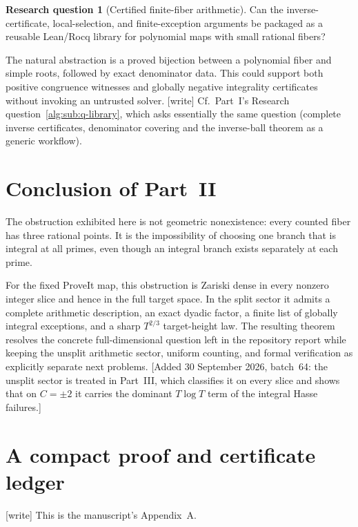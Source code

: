 \documentclass[11pt]{article}
\numberwithin{equation}{section}
\theoremstyle{plain}
\theoremstyle{plain}
\theoremstyle{plain}
\theoremstyle{definition}
\theoremstyle{definition}
\newtheorem{question}[question]{Research question}
\theoremstyle{definition}
\theoremstyle{remark}
\newcommand{\wtag}{\textup{[write]}}%
\begin{document}
\begin{question}[Certified finite-fiber arithmetic]\label{alg:dh:q:library}
Can the inverse-certificate, local-selection, and finite-exception
arguments be packaged as a reusable Lean/Rocq library for polynomial
maps with small rational fibers?
\end{question}
The natural abstraction is a proved bijection between a polynomial
fiber and simple roots, followed by exact denominator data. This could
support both positive congruence witnesses and globally negative
integrality certificates without invoking an untrusted solver.
\wtag{} Cf.\ Part~I's Research question~\ref{alg:sub:q-library}, which
asks essentially the same question (complete inverse certificates,
denominator covering and the inverse-ball theorem as a generic
workflow).

\section{Conclusion of Part~II}\label{alg:dh:sec:conclusion}
The obstruction exhibited here is not geometric nonexistence: every
counted fiber has three rational points. It is the impossibility of
choosing one branch that is integral at all primes, even though an
integral branch exists separately at each prime.

For the fixed ProveIt map, this obstruction is Zariski dense in every
nonzero integer slice and hence in the full target space. In the split
sector it admits a complete arithmetic description, an exact dyadic
factor, a finite list of globally integral exceptions, and a sharp
$T^{2/3}$ target-height law. The resulting theorem resolves the concrete
full-dimensional question left in the repository report while keeping
the unsplit arithmetic sector, uniform counting, and formal verification
as explicitly separate next problems.
[Added 30 September 2026, batch~64: the unsplit sector is treated in
Part~III, which classifies it on every slice and shows that on $C=\pm2$ it
carries the dominant $T\log T$ term of the integral Hasse failures.]

\section{A compact proof and certificate ledger}\label{alg:dh:sec:ledger}
\wtag{} This is the manuscript's Appendix~A.
\end{document}
